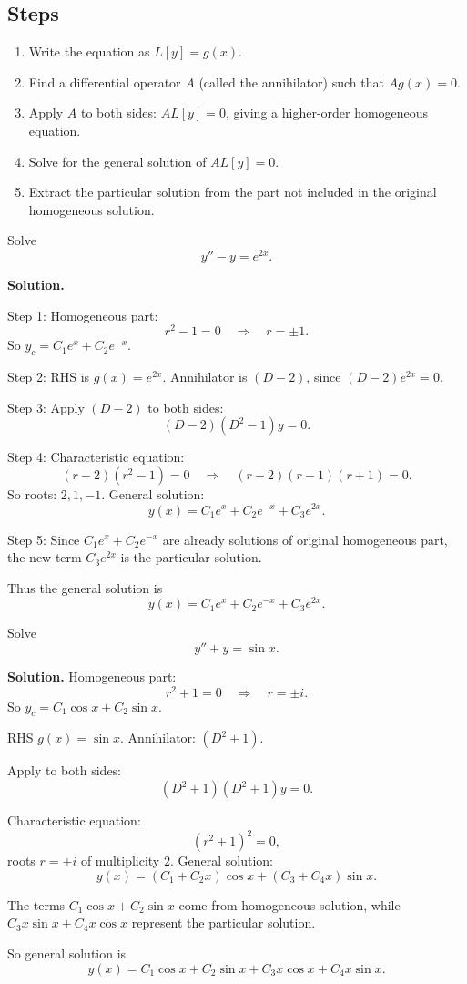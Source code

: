   \subsection*{Steps}
  \begin{enumerate}
    \item Write the equation as $L[y]=g(x)$.
    \item Find a differential operator $A$ (called the annihilator) such that $Ag(x)=0$.
    \item Apply $A$ to both sides: $AL[y]=0$, giving a higher-order homogeneous equation.
    \item Solve for the general solution of $AL[y]=0$.
    \item Extract the particular solution from the part not included in the original homogeneous solution.
  \end{enumerate}



  \begin{example}
  Solve
  \[
  y''-y=e^{2x}.
  \]

  \textbf{Solution.} 

  Step 1: Homogeneous part:
  \[
  r^2-1=0 \quad \Rightarrow \quad r=\pm1.
  \]
  So $y_c=C_1e^x+C_2e^{-x}$.

  Step 2: RHS is $g(x)=e^{2x}$. Annihilator is $(D-2)$, since $(D-2)e^{2x}=0$.

  Step 3: Apply $(D-2)$ to both sides:
  \[
  (D-2)(D^2-1)y=0.
  \]

  Step 4: Characteristic equation:
  \[
  (r-2)(r^2-1)=0 \quad \Rightarrow \quad (r-2)(r-1)(r+1)=0.
  \]
  So roots: $2,1,-1$. General solution:
  \[
  y(x)=C_1e^x+C_2e^{-x}+C_3e^{2x}.
  \]

  Step 5: Since $C_1e^x+C_2e^{-x}$ are already solutions of original homogeneous part, the new term $C_3e^{2x}$ is the particular solution.

  Thus the general solution is
  \[
  y(x)=C_1e^x+C_2e^{-x}+C_3e^{2x}.
  \]
  \end{example}


  \begin{example}
  Solve
  \[
  y''+y=\sin x.
  \]

  \textbf{Solution.}  
  Homogeneous part:
  \[
  r^2+1=0 \quad \Rightarrow \quad r=\pm i.
  \]
  So $y_c=C_1\cos x+C_2\sin x$.

  RHS $g(x)=\sin x$. Annihilator: $(D^2+1)$.

  Apply to both sides:
  \[
  (D^2+1)(D^2+1)y=0.
  \]

  Characteristic equation:
  \[
  (r^2+1)^2=0,
  \]
  roots $r=\pm i$ of multiplicity $2$.  
  General solution:
  \[
  y(x)=(C_1+C_2x)\cos x+(C_3+C_4x)\sin x.
  \]

  The terms $C_1\cos x+C_2\sin x$ come from homogeneous solution, while $C_3x\sin x+C_4x\cos x$ represent the particular solution.

  So general solution is
  \[
  y(x)=C_1\cos x+C_2\sin x+C_3x\cos x+C_4x\sin x.
  \]
  \end{example}


